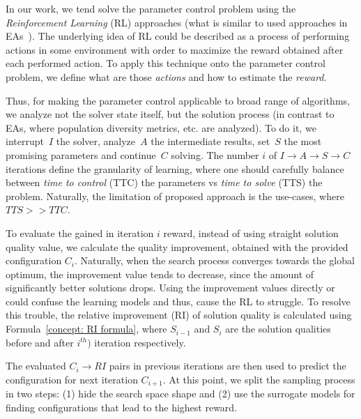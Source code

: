 In our work, we tend solve the parameter control problem using the \emph{Reinforcement Learning} (RL) approaches (what is similar to used approaches in EAs~\cite{karafotias2014generic}). 
The underlying idea of RL could be described as a process of performing actions in some environment with order to maximize the reward obtained after each performed action. To apply this technique onto the parameter control problem, we define what are those \emph{actions} and how to estimate the \emph{reward}. 

Thus, for making the parameter control applicable to broad range of algorithms, we analyze not the solver state itself, but the solution process (in contrast to EAs, where population diversity metrics, etc. are analyzed). To do it, we interrupt~$I$ the solver, analyze~$A$ the intermediate results, set~$S$ the most promising parameters and continue~$C$ solving. The number $i$ of $I \rightarrow A \rightarrow S \rightarrow C$ iterations define the granularity of learning, where one should carefully balance between \emph{time to control} (TTC) the parameters vs \emph{time to solve} (TTS) the problem. Naturally, the limitation of proposed approach is the use-cases, where $TTS >> TTC$.


To evaluate the gained in iteration $i$ reward, instead of using straight solution quality value, we calculate the quality improvement, obtained with the provided configuration $C_i$. Naturally, when the search process converges towards the global optimum, the improvement value tends to decrease, since the amount of significantly better solutions drops. Using the improvement values directly or could confuse the learning models and thus, cause the RL to struggle. To resolve this trouble, the relative improvement (RI) of solution quality is calculated using Formula~\ref{concept: RI formula}, where $S_{i-1}$ and $S_i$ are the solution qualities before and after $i^{th})$ iteration respectively.

The evaluated $C_i \rightarrow RI$ pairs in previous iterations are then used to predict the configuration for next iteration $C_{i+1}$. At this point, we split the sampling process in two steps: (1) hide the search space shape and (2) use the surrogate models for finding configurations that lead to the highest reward.



